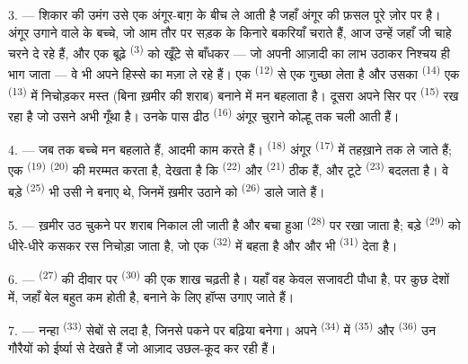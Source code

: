 3. --- शिकार की उमंग उसे एक अंगूर-बाग़ के बीच ले आती है जहाँ अंगूर की फ़सल पूरे
ज़ोर पर है। अंगूर उगाने वाले के बच्चे, जो आम तौर पर सड़क के किनारे बकरियाँ
चराते हैं, आज उन्हें जहाँ जी चाहे चरने दे रहे हैं, और एक बूढ़े 
\textsuperscript{(3)} को खूँटे से बाँधकर — जो अपनी आज़ादी का लाभ उठाकर निश्चय ही
भाग जाता — वे भी अपने हिस्से का मज़ा ले रहे हैं। एक 
\textsuperscript{(12)} से एक गुच्छा लेता है और उसका  \textsuperscript{(14)}
एक  \textsuperscript{(13)} में निचोड़कर मस्त (बिना ख़मीर की शराब)
बनाने में मन बहलाता है। दूसरा अपने सिर पर 
\textsuperscript{(15)} रख रहा है जो उसने अभी गूँथा है। उनके पास ढीठ
 \textsuperscript{(16)} अंगूर चुराने कोल्हू तक चली आती हैं।

4. --- जब तक बच्चे मन बहलाते हैं, आदमी काम करते हैं।
 \textsuperscript{(18)} अंगूर 
\textsuperscript{(17)} में तहख़ाने तक ले जाते हैं; एक 
\textsuperscript{(19)}  \textsuperscript{(20)} की मरम्मत करता है,
देखता है कि  \textsuperscript{(22)} और 
\textsuperscript{(21)} ठीक हैं, और टूटे  \textsuperscript{(23)}
बदलता है। वे बड़े  \textsuperscript{(25)} भी उसी ने बनाए थे, जिनमें
ख़मीर उठाने को  \textsuperscript{(26)} डाले जाते हैं।

5. --- ख़मीर उठ चुकने पर शराब निकाल ली जाती है और बचा हुआ 
\textsuperscript{(28)} पर रखा जाता है; बड़े  \textsuperscript{(29)} को
धीरे-धीरे कसकर रस निचोड़ा जाता है, जो एक  \textsuperscript{(32)} में
बहता है और और भी  \textsuperscript{(31)} देता है।

\VUsaut{6.0mm}
\VUsaut{3.4mm}

6. ---  \textsuperscript{(27)} की दीवार पर 
\textsuperscript{(30)} की एक शाख चढ़ती है। यहाँ वह केवल सजावटी पौधा है, पर कुछ
देशों में, जहाँ बेल बहुत कम होती है,  बनाने के लिए हॉप्स उगाए जाते
हैं।

7. --- नन्हा  \textsuperscript{(33)} सेबों से लदा है, जिनसे
पकने पर बढ़िया  बनेगा। अपने  \textsuperscript{(34)}
में  \textsuperscript{(35)} और 
\textsuperscript{(36)} उन गौरैयों को ईर्ष्या से देखते हैं जो आज़ाद उछल-कूद कर रही
हैं।

